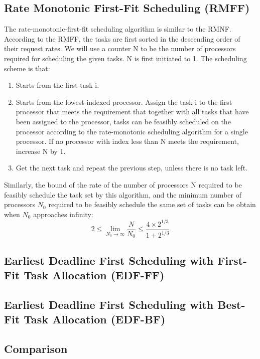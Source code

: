 \documentclass[preprint,12pt]{elsarticle}
\begin{document}
\subsection{Rate Monotonic First-Fit Scheduling (RMFF)}
The rate-monotonic-first-fit scheduling algorithm is similar to the RMNF. According to the RMFF, the tasks are first sorted in the descending order of their request rates. We will use a counter N to be the number of processors required for scheduling the given tasks. N is first initiated to 1. The scheduling scheme is that:
\begin{enumerate}
\item Starts from the first task i. 
\item Starts from the lowest-indexed processor. Assign the task i to the first processor that meets the requirement that together with all tasks that have been assigned to the processor, tasks can be feasibly scheduled on the processor according to the rate-monotonic scheduling algorithm for a single processor. If no processor with index less than N meets the requirement, increase N by 1. 
\item Get the next task and repeat the previous step, unless there is no task left.
\end{enumerate}

Similarly, the bound of the rate of the number of processors N required to be feasibly schedule the task set by this algorithm, and the minimum number of processors $N_0$ required to be feasibly schedule the same set of tasks can be obtain when $N_0$ approaches infinity: 
\begin{equation}
    2 \leq \lim_{N_0 \to \infty} \frac{N}{N_0} \leq \frac{4 \times 2^{1/3}}{1 + 2^{1/3}}
\end{equation}

\subsection{Earliest Deadline First Scheduling with First-Fit Task Allocation (EDF-FF)}

\subsection{Earliest Deadline First Scheduling with Best-Fit Task Allocation (EDF-BF)}

\subsection{Comparison}
\end{document}

